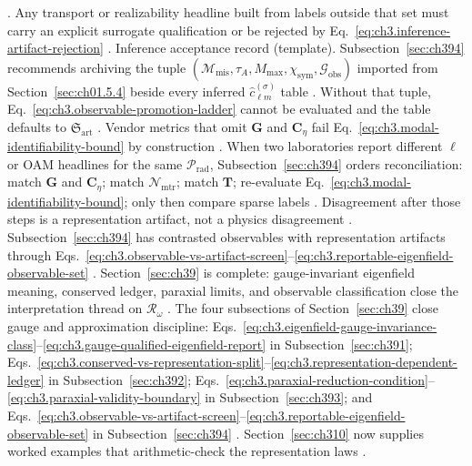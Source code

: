 \cite{belinfante1940}. Any transport or realizability headline built from labels outside that set must carry an explicit surrogate qualification or be rejected by Eq.~\eqref{eq:ch3.inference-artifact-rejection}
\cite{stratton1941}.
Inference acceptance record (template). Subsection~\ref{sec:ch394} recommends archiving the tuple \((\mathcal{M}_{\mathrm{mis}},\tau_{A},M_{\max},\chi_{\mathrm{sym}},\mathcal{G}_{\mathrm{obs}})\) imported from Section~\ref{sec:ch01.5.4} beside every inferred \(\widehat{c}_{\ell m}^{(\sigma)}\) table
\cite{harrington2001}. Without that tuple, Eq.~\eqref{eq:ch3.observable-promotion-ladder} cannot be evaluated and the table defaults to \(\mathfrak{S}_{\mathrm{art}}\)
\cite{belinfante1940}. Vendor metrics that omit \(\mathbf{G}\) and \(\mathbf{C}_{\eta}\) fail Eq.~\eqref{eq:ch3.modal-identifiability-bound} by construction
\cite{harrington2001}.
When two laboratories report different \(\ell\) or OAM headlines for the same \(\mathcal{P}_{\mathrm{rad}}\), Subsection~\ref{sec:ch394} orders reconciliation: match \(\mathbf{G}\) and \(\mathbf{C}_{\eta}\); match \(\mathcal{N}_{\mathrm{mtr}}\); match \(\mathbf{T}\); re-evaluate Eq.~\eqref{eq:ch3.modal-identifiability-bound}; only then compare sparse labels
\cite{harrington2001}. Disagreement after those steps is a representation artifact, not a physics disagreement
\cite{belinfante1940}.
Subsection~\ref{sec:ch394} has contrasted observables with representation artifacts through
Eqs.~\eqref{eq:ch3.observable-vs-artifact-screen}--\eqref{eq:ch3.reportable-eigenfield-observable-set}
\cite{harrington2001}. Section~\ref{sec:ch39} is complete: gauge-invariant eigenfield meaning, conserved ledger,
paraxial limits, and observable classification close the interpretation thread on \(\mathcal{R}_\omega\) \cite{belinfante1940}.
The four subsections of Section~\ref{sec:ch39} close gauge and approximation discipline:
Eqs.~\eqref{eq:ch3.eigenfield-gauge-invariance-class}--\eqref{eq:ch3.gauge-qualified-eigenfield-report} in Subsection~\ref{sec:ch391};
Eqs.~\eqref{eq:ch3.conserved-vs-representation-split}--\eqref{eq:ch3.representation-dependent-ledger} in Subsection~\ref{sec:ch392};
Eqs.~\eqref{eq:ch3.paraxial-reduction-condition}--\eqref{eq:ch3.paraxial-validity-boundary} in Subsection~\ref{sec:ch393}; and
Eqs.~\eqref{eq:ch3.observable-vs-artifact-screen}--\eqref{eq:ch3.reportable-eigenfield-observable-set} in Subsection~\ref{sec:ch394}
\cite{stratton1941}. Section~\ref{sec:ch310} now supplies worked examples that arithmetic-check
the representation laws \cite{hansen1988}.
